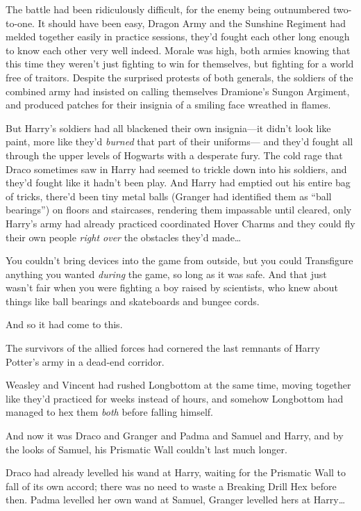 The battle had been ridiculously difficult, for the enemy being
outnumbered two-to-one. It should have been easy, Dragon Army and the
Sunshine Regiment had melded together easily in practice sessions,
they'd fought each other long enough to know each other very well
indeed. Morale was high, both armies knowing that this time they weren't
just fighting to win for themselves, but fighting for a world free of
traitors. Despite the surprised protests of both generals, the soldiers
of the combined army had insisted on calling themselves Dramione's
Sungon Argiment, and produced patches for their insignia of a smiling
face wreathed in flames.

But Harry's soldiers had all blackened their own insignia---it didn't
look like paint, more like they'd \emph{burned} that part of their
uniforms--- and they'd fought all through the upper levels of Hogwarts
with a desperate fury. The cold rage that Draco sometimes saw in Harry
had seemed to trickle down into his soldiers, and they'd fought like it
hadn't been play. And Harry had emptied out his entire bag of tricks,
there'd been tiny metal balls (Granger had identified them as ``ball
bearings'') on floors and staircases, rendering them impassable until
cleared, only Harry's army had already practiced coordinated Hover
Charms and they could fly their own people \emph{right over} the
obstacles they'd made\ldots{}

You couldn't bring devices into the game from outside, but you could
Transfigure anything you wanted \emph{during} the game, so long as it
was safe. And that just wasn't fair when you were fighting a boy raised
by scientists, who knew about things like ball bearings and skateboards
and bungee cords.

And so it had come to this.

The survivors of the allied forces had cornered the last remnants of
Harry Potter's army in a dead-end corridor.

Weasley and Vincent had rushed Longbottom at the same time, moving
together like they'd practiced for weeks instead of hours, and somehow
Longbottom had managed to hex them \emph{both} before falling himself.

And now it was Draco and Granger and Padma and Samuel and Harry, and by
the looks of Samuel, his Prismatic Wall couldn't last much longer.

Draco had already levelled his wand at Harry, waiting for the Prismatic
Wall to fall of its own accord; there was no need to waste a Breaking
Drill Hex before then. Padma levelled her own wand at Samuel, Granger
levelled hers at Harry\ldots{}

